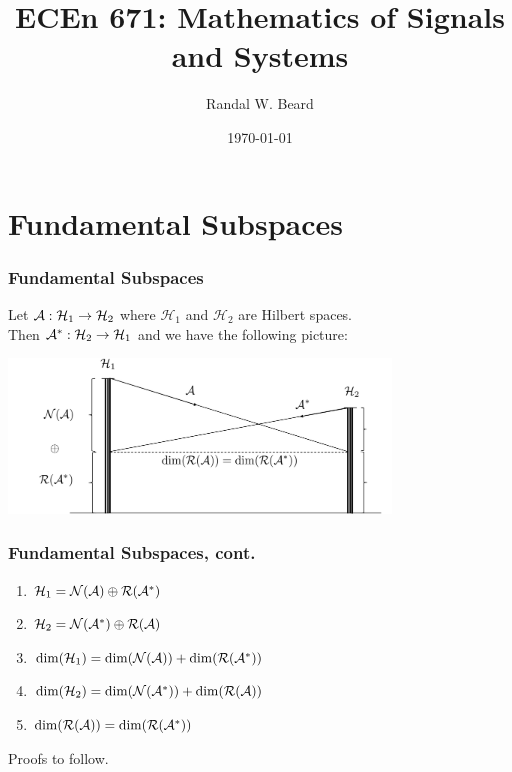 \documentclass{beamer}
\title{ECEn 671: Mathematics of Signals and Systems}
\author{Randal W. Beard}
\institute{Brigham Young University}
\date{\today}
\begin{document}
\begin{frame}
	\titlepage
\end{frame}


\section{Fundamental Subspaces}
\frame{\sectionpage}

\begin{frame}\frametitle{Fundamental Subspaces}
	Let $\mathcal{A}: \mathcal{H}_1 \to \mathcal{H}_2$ where $\mathcal{H}_1$ and $\mathcal{H}_2$ are Hilbert spaces. \\
	Then $\mathcal{A}^\ast:\mathcal{H}_2 \to \mathcal{H}_1$ and we have the following picture:\\
	\begin{center}
		\includegraphics[width=4in]{figures/chap4_fundamental_subspaces}\\
	\end{center}
\end{frame}

\begin{frame}\frametitle{Fundamental Subspaces, cont.}
	\begin{lemma}
		\begin{enumerate}
		\item $\mathcal{H}_1 = \mathcal{N}(\mathcal{A}) \oplus \mathcal{R}(\mathcal{A}^\ast)$
		\item $\mathcal{H}_2 = \mathcal{N}(\mathcal{A}^\ast) \oplus \mathcal{R}(\mathcal{A})$
		\item $\dim(\mathcal{H}_1) = \dim(\mathcal{N}(\mathcal{A})) + \dim(\mathcal{R}(\mathcal{A}^\ast))$
		\item $\dim(\mathcal{H}_2) = \dim(\mathcal{N}(\mathcal{A}^\ast)) + \dim(\mathcal{R}(\mathcal{A}))$\\
		\item $\dim(\mathcal{R}(\mathcal{A})) = \dim(\mathcal{R}(\mathcal{A}^\ast))$
		\end{enumerate}
	\end{lemma}
	
	Proofs to follow.
	
\end{frame}
\end{document}

